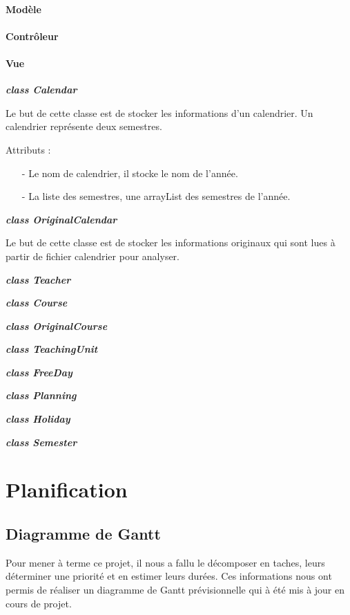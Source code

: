 \documentclass{polytech/polytech}
\begin{document}
	\subsubsection{Modèle}

	\subsubsection{Contrôleur}

	\subsubsection{Vue}
	\textbf{\textit{class Calendar}}

	Le but de cette classe est de stocker les informations d'un calendrier. Un calendrier représente deux semestres.

	Attributs :
	\begin{itemize}
		\item[-] Le nom de calendrier, il stocke le nom de l'année.
		\item[-] La liste des semestres, une arrayList des semestres de l'année.
	\end{itemize}

	\textbf{\textit{class OriginalCalendar}}

	Le but de cette classe est de stocker les informations originaux qui sont lues à partir de fichier calendrier pour analyser. 

	\textbf{\textit{class Teacher}}

	\textbf{\textit{class Course}}

	\textbf{\textit{class OriginalCourse}}

	\textbf{\textit{class TeachingUnit}}

	\textbf{\textit{class FreeDay}}

	\textbf{\textit{class Planning}}

	\textbf{\textit{class Holiday}}

	\textbf{\textit{class Semester}}

	\chapter{Planification}
	
	\section{Diagramme de Gantt}
	
	Pour mener à terme ce projet, il nous a fallu le décomposer en taches, leurs déterminer une priorité et en estimer leurs durées. Ces informations nous ont permis de réaliser un diagramme de Gantt prévisionnelle qui à été mis à jour en cours de projet.
	
\end{document}
